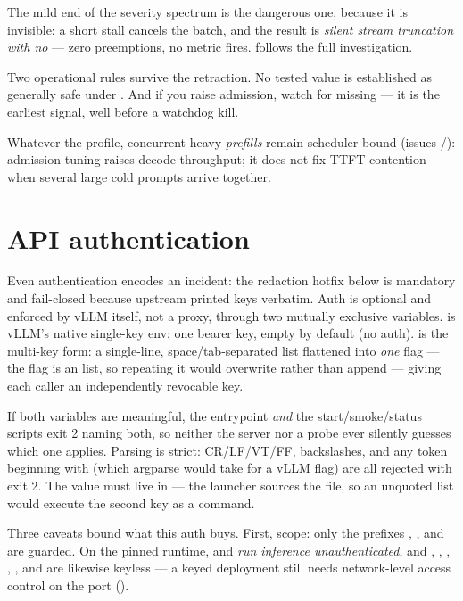 The mild end of the severity spectrum is the dangerous one, because it is
invisible: a short stall cancels the batch, and the result is \emph{silent
stream truncation with no } --- zero preemptions, no
metric fires.  follows the full investigation.

\begin{hbwarning}
Two operational rules survive the retraction. No tested
 value is established as generally safe under
. And if you raise admission, watch for missing
 --- it is the earliest signal, well before a watchdog
kill.
\end{hbwarning}

Whatever the profile, concurrent heavy \emph{prefills} remain
scheduler-bound (issues /): admission tuning raises
decode throughput; it does not fix TTFT contention when several large cold
prompts arrive together.

\section{API authentication}
\label{sec:profile-auth}

Even authentication encodes an incident: the redaction hotfix below is
mandatory and fail-closed because upstream printed keys verbatim. Auth is
optional and enforced by vLLM itself, not a proxy, through two
mutually exclusive variables.  is vLLM's native
single-key env: one bearer key, empty by default (no auth).
 is the multi-key form: a single-line,
space/tab-separated list flattened into \emph{one}  flag ---
the flag is an  list, so repeating it would overwrite rather than
append --- giving each caller an independently revocable key.

If both variables are meaningful, the entrypoint \emph{and} the
start/smoke/status scripts exit 2 naming both, so neither the server nor a
probe ever silently guesses which one applies. Parsing is strict: CR/LF/VT/FF,
backslashes, and any token beginning with \code{-} (which argparse would take
for a vLLM flag) are all rejected with exit 2. The value must live in
 --- the launcher sources the file, so an unquoted list
would execute the second key as a command.

Three caveats bound what this auth buys. First, scope: only the prefixes
, , and  are guarded. On the pinned
runtime,  and 
\emph{run inference unauthenticated}, and ,
, , , , and
 are likewise keyless --- a keyed deployment still needs
network-level access control on the port ().

